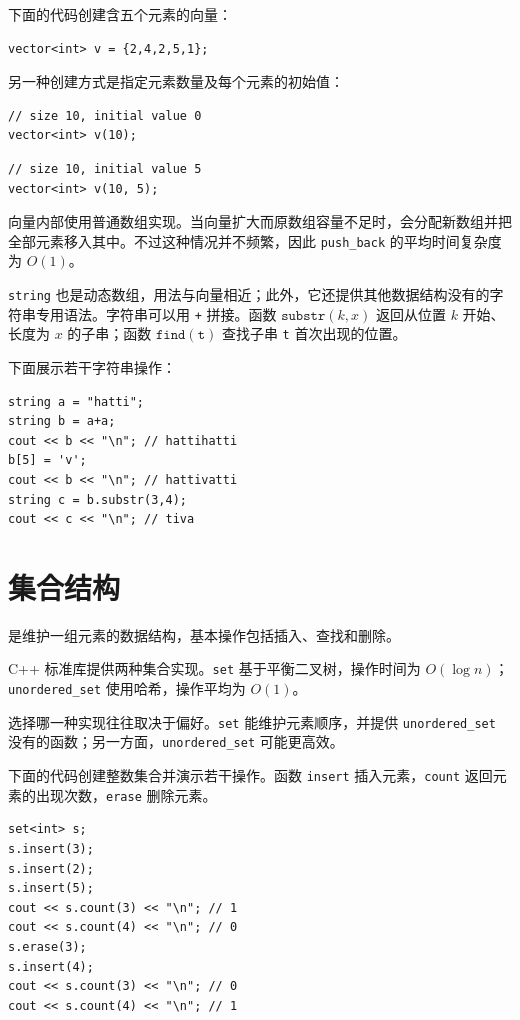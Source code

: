 下面的代码创建含五个元素的向量：

\begin{lstlisting}
vector<int> v = {2,4,2,5,1};
\end{lstlisting}

另一种创建方式是指定元素数量及每个元素的初始值：

\begin{lstlisting}
// size 10, initial value 0
vector<int> v(10);
\end{lstlisting}
\begin{lstlisting}
// size 10, initial value 5
vector<int> v(10, 5);
\end{lstlisting}

向量内部使用普通数组实现。当向量扩大而原数组容量不足时，会分配新数组并把全部元素移入其中。不过这种情况并不频繁，因此 \texttt{push\_back} 的平均时间复杂度为 $O(1)$。


\texttt{string} 也是动态数组，用法与向量相近；此外，它还提供其他数据结构没有的字符串专用语法。字符串可以用 \texttt{+} 拼接。函数 $\texttt{substr}(k,x)$ 返回从位置 $k$ 开始、长度为 $x$ 的子串；函数 $\texttt{find}(\texttt{t})$ 查找子串 \texttt{t} 首次出现的位置。

下面展示若干字符串操作：

\begin{lstlisting}
string a = "hatti";
string b = a+a;
cout << b << "\n"; // hattihatti
b[5] = 'v';
cout << b << "\n"; // hattivatti
string c = b.substr(3,4);
cout << c << "\n"; // tiva
\end{lstlisting}

\section{集合结构}


是维护一组元素的数据结构，基本操作包括插入、查找和删除。

C++ 标准库提供两种集合实现。\texttt{set} 基于平衡二叉树，操作时间为 $O(\log n)$；\texttt{unordered\_set} 使用哈希，操作平均为 $O(1)$。

选择哪一种实现往往取决于偏好。\texttt{set} 能维护元素顺序，并提供 \texttt{unordered\_set} 没有的函数；另一方面，\texttt{unordered\_set} 可能更高效。

下面的代码创建整数集合并演示若干操作。函数 \texttt{insert} 插入元素，\texttt{count} 返回元素的出现次数，\texttt{erase} 删除元素。

\begin{lstlisting}
set<int> s;
s.insert(3);
s.insert(2);
s.insert(5);
cout << s.count(3) << "\n"; // 1
cout << s.count(4) << "\n"; // 0
s.erase(3);
s.insert(4);
cout << s.count(3) << "\n"; // 0
cout << s.count(4) << "\n"; // 1
\end{lstlisting}

